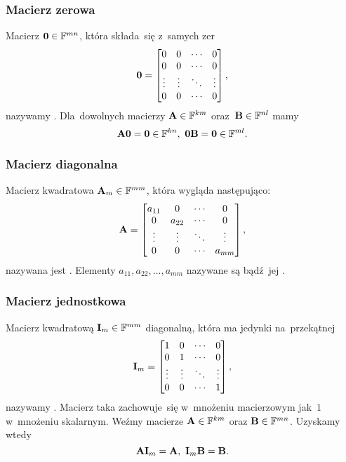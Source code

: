 \subsubsection{Macierz zerowa}
Macierz $\mathbf{0}\in \mathbb{F}^{mn}$, która składa~się z~samych zer
$$
	\mathbf{0}=
	\begin{bmatrix}
		0      & 0      & \cdots & 0      \\
		0      & 0      & \cdots & 0      \\
		\vdots & \vdots & \ddots & \vdots \\
		0      & 0      & \cdots & 0      \\
	\end{bmatrix},
$$
nazywamy .
Dla~dowolnych macierzy $\mathbf{A}\in \mathbb{F}^{km}$ oraz~$\mathbf{B}\in \mathbb{F}^{nl}$
mamy
$$
	\mat{A}\mat{0} = \mat{0}\in \Field^{kn}, \ \mat{0}\mat{B} = \mat{0}\in \Field^{ml}.
$$

\subsubsection{Macierz diagonalna}
Macierz kwadratowa $\mathbf{A}_m\in \mathbb{F}^{mm}$, która wygląda następująco:
$$
	\mathbf{A} =
	\begin{bmatrix}
		a_{11} & 0      & \cdots & 0      \\
		0      & a_{22} & \cdots & 0      \\
		\vdots & \vdots & \ddots & \vdots \\
		0      & 0      & \cdots & a_{mm}
	\end{bmatrix},
$$
nazywana jest .
Elementy $a_{11}, a_{22}, \ldots, a_{mm}$ nazywane są  bądź~jej
.

\subsubsection{Macierz jednostkowa}
Macierz kwadratową $\mathbf{I}_m\in \mathbb{F}^{mm}$ diagonalną, która ma jedynki na~przekątnej
$$
	\mathbf{I}_m=
	\begin{bmatrix}
		1      & 0      & \cdots & 0      \\
		0      & 1      & \cdots & 0      \\
		\vdots & \vdots & \ddots & \vdots \\
		0      & 0      & \cdots & 1      \\
	\end{bmatrix},
$$
nazywamy . Macierz taka zachowuje~się
w~mnożeniu macierzowym jak~$1$ w~mnożeniu skalarnym. Weźmy macierze
$\mathbf{A}\in \mathbb{F}^{km}$ oraz
$\mathbf{B}\in \mathbb{F}^{mn}$. Uzyskamy wtedy
$$
	\mat{A}\mat{\id}_m = \mat{A}, \ \mat{\id}_m\mat{B} = \mat{B}.
$$

